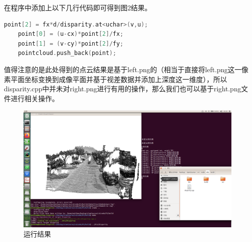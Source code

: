 \documentclass[
	12pt, %
]{fphw} %
\begin{document}
在程序中添加上以下几行代码即可得到图2结果。

\begin{lstlisting}[language=C++, caption=题3所添代码]
	point[2] = fx*d/disparity.at<uchar>(v,u);
	point[0] = (u-cx)*point[2]/fx;
	point[1] = (v-cy)*point[2]/fy;
	pointcloud.push_back(point);	
\end{lstlisting}

值得注意的是此处得到的点云结果是基于left.png的（相当于直接将left.png这一像素平面坐标变换到成像平面并基于视差数据并添加上深度这一维度），所以disparity.cpp中并未对right.png进行有用的操作，那么我们也可以基于right.png文件进行相关操作。

\begin{figure}[h]
	\centering
	\includegraphics[width=0.9\columnwidth]{pic3.png} %
	\caption{运行结果}
\end{figure}

\clearpage
\end{document}
